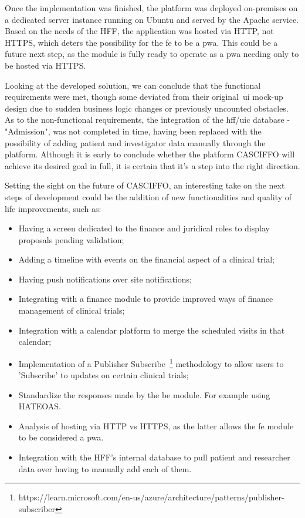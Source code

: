 Once the implementation was finished, the platform was deployed on-premises on a dedicated server instance running on Ubuntu and served by the Apache service. Based on the needs of the HFF, the application was hosted via HTTP, not HTTPS, which deters the possibility for the \acrshort{fe} to be a \acrshort{pwa}. This could be a future next step, as the module is fully ready to operate as a \acrshort{pwa} needing only to be hosted via HTTPS.

Looking at the developed solution, we can conclude that the functional requirements were met, though some deviated from their original~\acrshort{ui} mock-up design due to sudden business logic changes or previously uncounted obstacles.
As to the non-functional requirements, the integration of the \acrshort{hff}/\acrshort{uic} database - "Admission", was not completed in time, having been replaced with the possibility of adding patient and investigator data manually through the platform.
Although it is early to conclude whether the platform CASCIFFO will achieve its desired goal in full, it is certain that it's a step into the right direction.

Setting the sight on the future of CASCIFFO, an interesting take on the next steps of development could be the addition of new functionalities and quality of life improvements, such as:
\begin{itemize}
    \item Having a screen dedicated to the finance and juridical roles to display proposals pending validation; 
    \item Adding a timeline with events on the financial aspect of a clinical trial;
    \item Having push notifications over site notifications;
    \item Integrating with a finance module to provide improved ways of finance management of clinical trials;
    \item Integration with a calendar platform to merge the scheduled visits in that calendar;
    \item Implementation of a Publisher Subscribe~\footnote{https://learn.microsoft.com/en-us/azure/architecture/patterns/publisher-subscriber}\label{fn:pub-sub} methodology to allow users to 'Subscribe' to updates on certain clinical trials;
    \item Standardize the responses made by the \acrlong{be} module. For example using HATEOAS.
    \item Analysis of hosting via HTTP vs HTTPS, as the latter allows the \acrshort{fe} module to be considered a \acrshort{pwa}.
    \item Integration with the HFF's internal database to pull patient and researcher data over having to manually add each of them.
\end{itemize}
